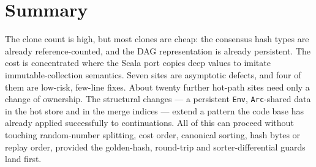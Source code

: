 \documentclass[11pt]{article}
\begin{document}
\section{Summary}

The clone count is high, but most clones are cheap: the consensus hash types are already
reference-counted, and the DAG representation is already persistent. The cost is concentrated
where the Scala port copies deep values to imitate immutable-collection semantics. Seven sites
are asymptotic defects, and four of them are low-risk, few-line fixes. About twenty further hot-path
sites need only a change of ownership. The structural changes --- a persistent \texttt{Env},
\texttt{Arc}-shared data in the hot store and in the merge indices --- extend a pattern the
code base has already applied successfully to continuations. All of this can proceed without
touching random-number splitting, cost order, canonical sorting, hash bytes or replay order,
provided the golden-hash, round-trip and sorter-differential guards land first.

\appendix
\end{document}
